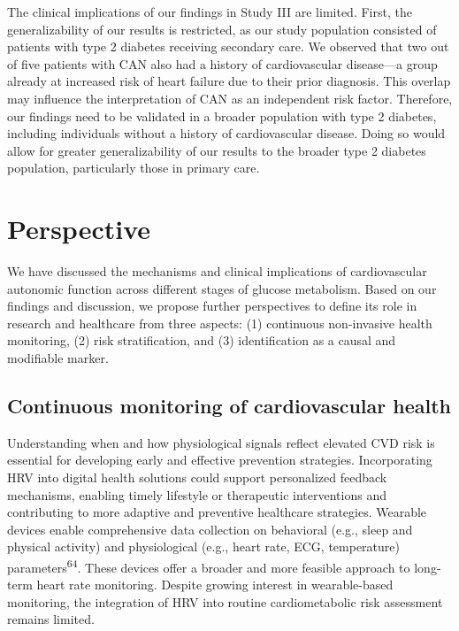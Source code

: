 \documentclass[
  a4paper,
  headsepline=true,
  open=any]{scrbook}
\begin{document}
The clinical implications of our findings in Study III are limited.
First, the generalizability of our results is restricted, as our study
population consisted of patients with type 2 diabetes receiving
secondary care. We observed that two out of five patients with CAN also
had a history of cardiovascular disease---a group already at increased
risk of heart failure due to their prior diagnosis. This overlap may
influence the interpretation of CAN as an independent risk factor.
Therefore, our findings need to be validated in a broader population
with type 2 diabetes, including individuals without a history of
cardiovascular disease. Doing so would allow for greater
generalizability of our results to the broader type 2 diabetes
population, particularly those in primary care.


\hypertarget{perspective}{%
\chapter{Perspective}\label{perspective}}

We have discussed the mechanisms and clinical implications of
cardiovascular autonomic function across different stages of glucose
metabolism. Based on our findings and discussion, we propose further
perspectives to define its role in research and healthcare from three
aspects: (1) continuous non-invasive health monitoring, (2) risk
stratification, and (3) identification as a causal and modifiable
marker.

\hypertarget{continuous-monitoring-of-cardiovascular-health}{%
\section{Continuous monitoring of cardiovascular
health}\label{continuous-monitoring-of-cardiovascular-health}}

Understanding when and how physiological signals reflect elevated CVD
risk is essential for developing early and effective prevention
strategies. Incorporating HRV into digital health solutions could
support personalized feedback mechanisms, enabling timely lifestyle or
therapeutic interventions and contributing to more adaptive and
preventive healthcare strategies. Wearable devices enable comprehensive
data collection on behavioral (e.g., sleep and physical activity) and
physiological (e.g., heart rate, ECG, temperature)
parameters\textsuperscript{64}. These devices offer a broader and more
feasible approach to long-term heart rate monitoring. Despite growing
interest in wearable-based monitoring, the integration of HRV into
routine cardiometabolic risk assessment remains limited.
\end{document}
